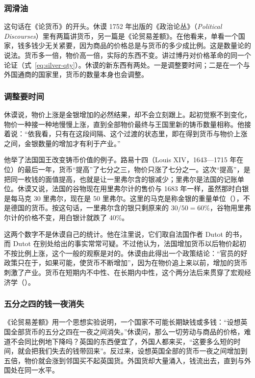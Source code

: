 \subsubsection{润滑油}
这句话在《论货币》的开头。休谟 1752 年出版的《政治论丛》（\emph{Political Discourses}）里有两篇讲货币，另一篇是《论贸易差额》\cite{hume1752}。在他看来，单看一个国家，钱多钱少无关紧要，因为商品的价格总是与货币的多少成比例\cite{hume1752}。这是数量论的说法。货币多一倍，物价高一倍，实际的东西不变。讲过博丹对价格革命的同一个论证（式~\eqref{eq:silver-qty}）。休谟的新东西有两处。一是调整要时间；二是在一个与外国通商的国家里，货币的数量本身也会调整。

\subsubsection{调整要时间}
休谟说，物价上涨是金银增加的必然结果，却不会立刻跟上。起初觉察不到变化，物价一种接一种地慢慢上涨，直到全部物价最终与王国里新的铸币数量相称。他接着说：“依我看，只有在这段间隔、这个过渡的状态里，即在得到货币与物价上涨之间，金银数量的增加才有利于产业。”\cite{hume1752}

他举了法国国王改变铸币价值的例子。路易十四（Louis XIV，1643—1715 年在位）的最后一年，货币“提高”了七分之三，物价只涨了七分之一。这次“提高”，是把同一枚钱的面值提高，也就是让一里弗尔含的银减少；里弗尔是法国的记账单位。休谟又说，法国的谷物现在用里弗尔计的售价与 1683 年一样，虽然那时白银是每马克 30 里弗尔，现在是 50 里弗尔\cite{hume1752}。这里的马克是称金银的重量单位（），不是德国的货币。按这句话，一里弗尔含的银只剩原来的 $30/50=60\%$，谷物用里弗尔计的价格不变，用白银计就跌了 40\%。

这两个数字不是休谟自己的统计。他在注里说，它们取自法国作者 Dutot 的书，而 Dutot 在别处给出的事实常常可疑。不过他认为，法国增加货币以后物价起初不按比例上涨，这个一般的观察是对的\cite{hume1752}。休谟由此得出一个政策结论：“官员的好政策只在于，如果可能，使货币不断增加”\cite{hume1752}，因为在物价追上来以前，增加的货币刺激了产业。货币在短期内不中性、在长期内中性，这个两分法后来贯穿了宏观经济学（）。

\subsubsection{五分之四的钱一夜消失}
《论贸易差额》用一个思想实验说明，一个国家不可能长期缺钱或多钱：“设想英国全部货币的五分之四在一夜之间消失。”休谟问，那么一切劳动与商品的价格，难道不会同比例地下降吗？英国的东西便宜了，外国人都来买，“这要多么短的时间，就会把我们失去的钱带回来”\cite{hume1752}。反过来，设想英国全部的货币一夜之间增加到五倍，物价就会涨到邻国买不起英国货。外国货却大量涌入，钱流出去，直到与外国处在同一水平\cite{hume1752}。

